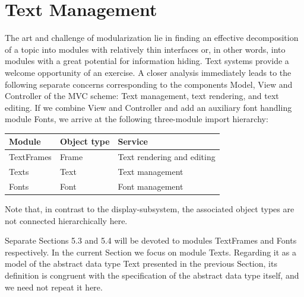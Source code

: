 \section{Text Management}
\label{sec:textmanagement}
The art and challenge of modularization lie in finding an effective decomposition of a topic into
modules with relatively thin interfaces or, in other words, into modules with a great potential for
information hiding. Text systems provide a welcome opportunity of an exercise. A closer analysis
immediately leads to the following separate concerns corresponding to the components Model,
View and Controller of the MVC scheme: Text management, text rendering, and text editing. If we
combine View and Controller and add an auxiliary font handling module Fonts, we arrive at the
following three-module import hierarchy:
\begin{table}[h!]
  \begin{tabular}{l l l}
    Module     &Object type &Service \\\hline
    TextFrames &Frame       &Text rendering and editing\\
    Texts      &Text        &Text management \\
    Fonts      &Font        &Font management
  \end{tabular}
\end{table}

Note that, in contrast to the display-subsystem, the associated object types are not connected hierarchically here.

Separate Sections 5.3 and 5.4 will be devoted to modules TextFrames and Fonts respectively. In
the current Section we focus on module Texts. Regarding it as a model of the abstract data type
Text presented in the previous Section, its definition is congruent with the specification of the
abstract data type itself, and we need not repeat it here.

